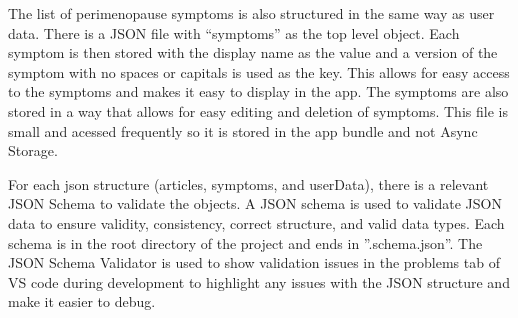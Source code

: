 The list of perimenopause symptoms is also structured in the same way as user data. There is a JSON file with ``symptoms'' as the top level object. Each symptom is then stored with the display name as the value and a version of the symptom with no spaces or capitals is used as the key. This allows for easy access to the symptoms and makes it easy to display in the app. The symptoms are also stored in a way that allows for easy editing and deletion of symptoms. This file is small and acessed frequently so it is stored in the app bundle and not Async Storage.

For each json structure (articles, symptoms, and userData), there is a relevant JSON Schema to validate the objects. A JSON schema is used to validate JSON data to ensure validity, consistency, correct structure, and valid data types\cite{JsonSchema2025}\cite{JsonSchemaOrg2025}. Each schema is in the root directory of the project and ends in ''.schema.json''. The JSON Schema Validator is used to show validation issues in the problems tab of VS code during development to highlight any issues with the JSON structure and make it easier to debug.